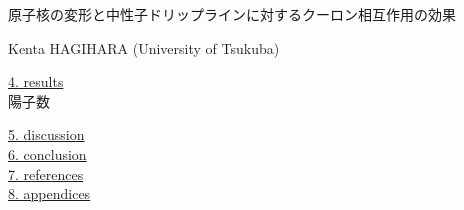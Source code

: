 \topmargin=-14mm
\oddsidemargin=-5mm   %
\evensidemargin=-5mm  %
\textheight=247mm %
\textwidth=170mm  %
\newcommand{\mysection}[1]{\vspace{\baselineskip} \noindent \underline{#1} \\}
\newcommand{\vecrp}[0]{{\vec{r}\,}'}

\baselineskip=0.6cm

\begin{center}
{\Large
原子核の変形と中性子ドリップラインに対するクーロン相互作用の効果
}
\end{center}


\begin{flushright}
Kenta HAGIHARA (University of Tsukuba)
\end{flushright}



\mysection{4. results}
陽子数


\mysection{5. discussion}

\mysection{6. conclusion}

\mysection{7. references}

\mysection{8. appendices}


